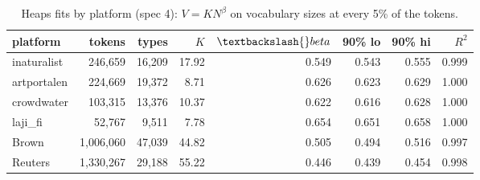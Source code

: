 \begin{table}[htbp]
\centering
\small
\caption{Heaps fits by platform (spec 4): $V = K N^\beta$ on vocabulary sizes at every 5\% of the tokens.}
\label{tab:heaps-platform}
\begin{tabular}{lrrrrrrr}
\toprule
platform & tokens & types & $K$ & $\textbackslash{}beta$ & 90\% lo & 90\% hi & $R^2$ \\
\midrule
inaturalist & 246{,}659 & 16{,}209 & 17.92 & 0.549 & 0.543 & 0.555 & 0.999 \\
artportalen & 224{,}669 & 19{,}372 & 8.71 & 0.626 & 0.623 & 0.629 & 1.000 \\
crowdwater & 103{,}315 & 13{,}376 & 10.37 & 0.622 & 0.616 & 0.628 & 1.000 \\
laji\_fi & 52{,}767 & 9{,}511 & 7.78 & 0.654 & 0.651 & 0.658 & 1.000 \\
Brown & 1{,}006{,}060 & 47{,}039 & 44.82 & 0.505 & 0.494 & 0.516 & 0.997 \\
Reuters & 1{,}330{,}267 & 29{,}188 & 55.22 & 0.446 & 0.439 & 0.454 & 0.998 \\
\bottomrule
\end{tabular}
\end{table}
